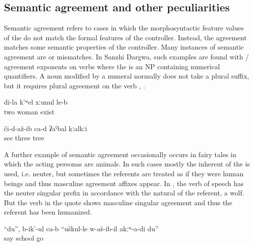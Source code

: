 
\subsection{Semantic agreement and other peculiarities}
\label{ssec:Semantic agreement and other deviations}

Semantic agreement refers to cases in which the morphosyntactic feature values of the  do not match the formal features of the controller. Instead, the agreement matches some semantic properties of the controller. Many instances of semantic agreement are  or  mismatches. In Sanzhi Dargwa, such examples are found with / agreement exponents on verbs where the  is an NP containing numerical quantifiers. A noun modified by a numeral normally does not take a plural suffix, but it requires plural agreement on the verb , . 
%
\begin{exe}
	\ex	\label{ex:I have two wives@15}
	\gll	di-la	k'ʷel	xːunul	le-b\\
			two	woman	exist\\
	\glt	{}

	\ex	\label{ex:(He) saw three trees}
	\gll	či-d-až-ib	ca-d	ʡaˁbal	kːalkːi\\
		see		three	tree\\
	\glt	{}
\end{exe}

A further example of semantic agreement occasionally occurs in fairy tales in which the acting personas are animals. In such cases mostly the inherent  of the  is used, i.e. neuter, but sometimes the referents are treated as if they were human beings and thus masculine agreement affixes appear. In , the verb of speech has the neuter singular prefix in accordance with the natural  of the referent, a wolf. But the verb in the quote shows masculine singular agreement and thus the referent has been humanized.
%
\begin{exe}
	\ex	\label{ex:‎‎‎(The wolf) said, I did not go to school.}
	\gll	``du'',	b-ik'-ul	ca-b	``uškul-le	w-aš-ib-il	akːʷ-a-di	du''\\
			say		school	go		\\
	\glt	{}
\end{exe}

